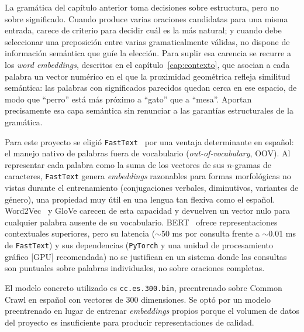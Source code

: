 La gramática del capítulo anterior toma decisiones sobre estructura, pero no sobre significado. Cuando produce varias oraciones candidatas para una misma entrada, carece de criterio para decidir cuál es la más natural; y cuando debe seleccionar una preposición entre varias gramaticalmente válidas, no dispone de información semántica que guíe la elección. Para suplir esa carencia se recurre a los \textit{word embeddings}, descritos en el capítulo~\ref{cap:contexto}, que asocian a cada palabra un vector numérico en el que la proximidad geométrica refleja similitud semántica: las palabras con significados parecidos quedan cerca en ese espacio, de modo que ``perro'' está más próximo a ``gato'' que a ``mesa''. Aportan precisamente esa capa semántica sin renunciar a las garantías estructurales de la gramática.

Para este proyecto se eligió \texttt{FastText}~\cite{bojanowski2017fasttext} por una ventaja determinante en español: el manejo nativo de palabras fuera de vocabulario (\textit{out-of-vocabulary}, OOV). Al representar cada palabra como la suma de los vectores de sus $n$-gramas de caracteres, \texttt{FastText} genera \textit{embeddings} razonables para formas morfológicas no vistas durante el entrenamiento (conjugaciones verbales, diminutivos, variantes de género), una propiedad muy útil en una lengua tan flexiva como el español. Word2Vec~\cite{mikolov2013word2vec} y GloVe carecen de esta capacidad y devuelven un vector nulo para cualquier palabra ausente de su vocabulario. BERT~\cite{devlin2019bert} ofrece representaciones contextuales superiores, pero su latencia ($\sim$50 ms por consulta frente a $\sim$0.01 ms de \texttt{FastText}) y sus dependencias (\texttt{PyTorch} y una unidad de procesamiento gráfico [GPU] recomendada) no se justifican en un sistema donde las consultas son puntuales sobre palabras individuales, no sobre oraciones completas.

El modelo concreto utilizado es \texttt{cc.es.300.bin}, preentrenado sobre Common Crawl en español con vectores de 300 dimensiones. Se optó por un modelo preentrenado en lugar de entrenar \textit{embeddings} propios porque el volumen de datos del proyecto es insuficiente para producir representaciones de calidad.

